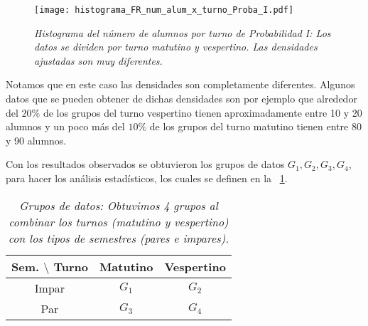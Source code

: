 
\begin{figure}[H]
\centering
\texttt{[image: histograma\_FR\_num\_alum\_x\_turno\_Proba\_I.pdf]} %
\caption[\textit{Histograma del número de alumnos por turno: Probabilidad I}]{\textit{Histograma del número de alumnos por turno de Probabilidad I: Los datos se dividen por turno matutino y vespertino. Las densidades ajustadas son muy diferentes.}}\label{HistAlumTurnoProbaI}
\end{figure}

Notamos que en este caso las densidades son completamente diferentes. Algunos datos que se pueden obtener de dichas densidades son por ejemplo que alrededor del $20\%$ de los grupos del turno vespertino tienen aproximadamente entre 10 y 20 alumnos y un poco más del $10\%$ de los grupos del turno matutino tienen entre 80 y 90 alumnos.

Con los resultados observados se obtuvieron los grupos de datos $G_{1}, G_{2}, G_{3}, G_{4}$, para hacer los análisis estadísticos, los cuales se definen en la \tablename{~\ref{GposDatos}}.

\begin{table}[H]
\centering
\begin{tabular}{|c|c|c|}
\hline 
\textbf{Sem.} $\setminus$ \textbf{Turno} & \textbf{Matutino} & \textbf{Vespertino} \\ 
\hline 
Impar & $G_{1}$ & $G_{2}$ \\ 
\hline 
Par & $G_{3}$ & $G_{4}$ \\ 
\hline 
\end{tabular}
\caption[\textit{Grupos de datos}]{\textit{Grupos de datos: Obtuvimos 4 grupos al combinar los turnos (matutino y vespertino) con los tipos de semestres (pares e impares).}}\label{GposDatos}
\end{table}
